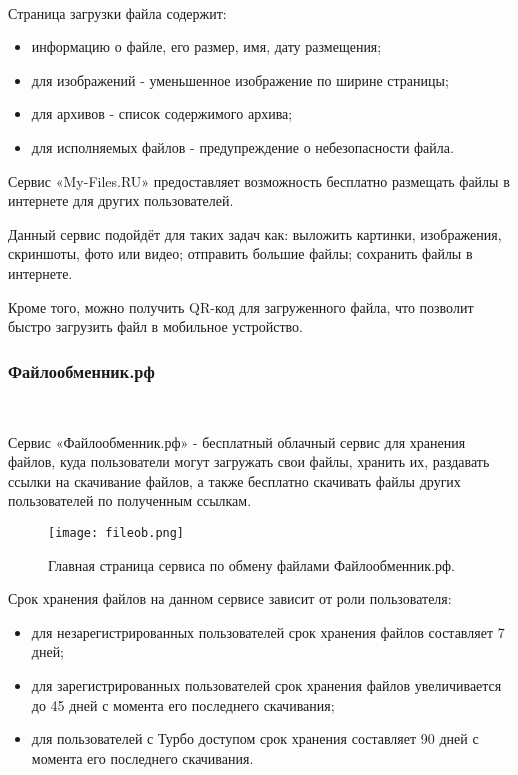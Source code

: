 ~\\Страница загрузки файла содержит:
\begin{itemize}
  \item информацию о файле, его размер, имя, дату размещения;
  \item для изображений - уменьшенное изображение по ширине страницы;
  \item для архивов - список содержимого архива;
  \item для исполняемых файлов - предупреждение о небезопасности файла.
\end{itemize}

Сервис «My-Files.RU» предоставляет возможность бесплатно размещать файлы в интернете для других пользователей.

Данный сервис подойдёт для таких задач как: выложить картинки, изображения, скриншоты, фото или видео; отправить большие файлы; сохранить файлы в интернете.

Кроме того, можно получить QR-код для загруженного файла, что позволит быстро загрузить файл в мобильное устройство.

\subsubsection{Файлообменник.рф}~\\
\label{ssub:practice:itechart_characteristic:fileob}

Сервис «Файлообменник.рф» - бесплатный облачный сервис для хранения файлов, куда пользователи могут загружать свои файлы, хранить их, раздавать ссылки на скачивание файлов, а также бесплатно скачивать файлы других пользователей по полученным ссылкам.

\begin{figure}[ht]
  \centering
  \texttt{[image: fileob.png]}  
    \caption{ Главная страница сервиса по обмену файлами Файлообменник.рф. }
    \label{fig:rghost}
\end{figure}

Срок хранения файлов на данном сервисе зависит от роли пользователя:
\begin{itemize}
  \item для незарегистрированных пользователей срок хранения файлов составляет 7 дней;
  \item для зарегистрированных пользователей срок хранения файлов увеличивается до 45 дней с момента его последнего скачивания;
  \item для пользователей с Турбо доступом срок хранения составляет 90 дней с момента его последнего скачивания.
\end{itemize}

